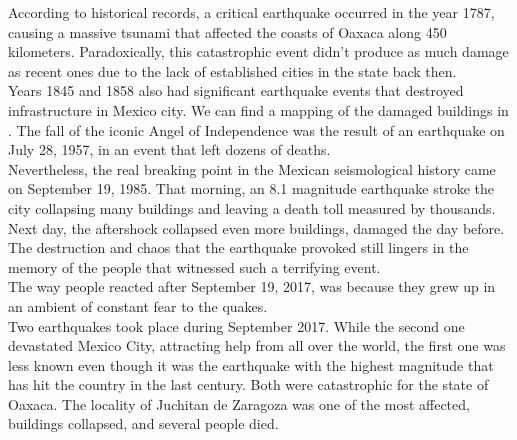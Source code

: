 According to historical records, a critical earthquake occurred in the year 1787, causing a massive tsunami that affected the coasts of Oaxaca along 450 kilometers. Paradoxically, this catastrophic event didn't produce as much damage as recent ones due to the lack of established cities in the state back then.\\

Years 1845 and 1858 also had significant earthquake events that destroyed infrastructure in Mexico city. We can find a mapping of the damaged buildings in \cite{AG3316}. The fall of the iconic Angel of Independence was the result of an earthquake on July 28, 1957, in an event that left dozens of deaths.\\

Nevertheless, the real breaking point in the Mexican seismological history came on September 19, 1985. That morning, an 8.1 magnitude earthquake stroke the city collapsing many buildings and leaving a death toll measured by thousands. Next day, the aftershock collapsed even more buildings, damaged the day before. The destruction and chaos that the earthquake provoked still lingers in the memory of the people that witnessed such a terrifying event.\\

The way people reacted after September 19, 2017, was because they grew up in an ambient of constant fear to the quakes.\\

Two earthquakes took place during September 2017. While the second one devastated Mexico City, attracting help from all over the world, the first one was less known even though it was the earthquake with the highest magnitude that has hit the country in the last century. Both were catastrophic for the state of Oaxaca. The locality of Juchitan de Zaragoza was one of the most affected, buildings collapsed, and several people died.\\

